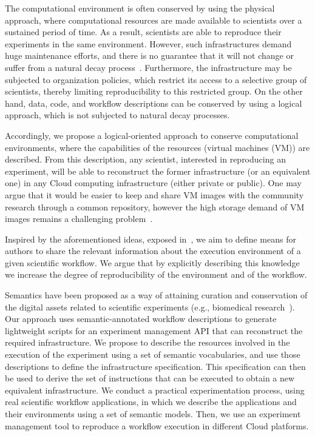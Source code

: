 The computational environment is often conserved by using the physical approach, where 
computational resources are made available to scientists over a sustained period of time. 
As a result, scientists are able to reproduce their experiments in the same environment. 
However, such infrastructures demand huge maintenance efforts, and there is no guarantee 
that it will not change or suffer from a natural decay process~\cite{Gavish2011637}. 
Furthermore, the infrastructure may be subjected to organization policies, which restrict 
its access to a selective group of scientists, thereby limiting reproducibility to this restricted 
group. On the other hand, data, code, and workflow descriptions can be conserved by using 
a logical approach, which is not subjected to natural decay processes.

Accordingly, we propose a logical-oriented approach to conserve computational environments, 
where the capabilities of the resources (virtual machines (VM)) are described. From this 
description, any scientist, interested in reproducing an experiment, will be able to reconstruct 
the former infrastructure (or an equivalent one) in any Cloud computing infrastructure (either 
private or public). One may argue that it would be easier to keep and share VM images with 
the community research through a common repository, however the high storage demand of 
VM images remains a challenging problem~\cite{Mao:2014:ROD:2600090.2512348,6552826}. 


Inspired by the aforementioned ideas, exposed in~\cite{King1995}, we aim to  define means 
for authors to share the relevant information about the execution environment of a given scientific
workflow. We argue that by explicitly describing this knowledge we increase the degree of 
reproducibility of the environment and of the workflow.

Semantics have been proposed as a way of attaining curation and conservation of the digital 
assets related to scientific experiments (e.g., biomedical research~\cite{MaloneSWO2014}). 
Our approach uses semantic-annotated workflow descriptions to generate lightweight scripts 
for an experiment management API that can reconstruct the required infrastructure. We 
propose to describe the resources involved in the execution of the experiment using a set of 
semantic vocabularies, and use those descriptions to define the infrastructure specification. 
This specification can then be used to derive the set of instructions that can be executed to 
obtain a new equivalent infrastructure. We conduct a practical experimentation process,  using real scientific 
workflow applications, in which we describe the applications and their environments using a 
set of semantic models. Then, we use an experiment management tool to reproduce a 
workflow execution in different Cloud platforms.

